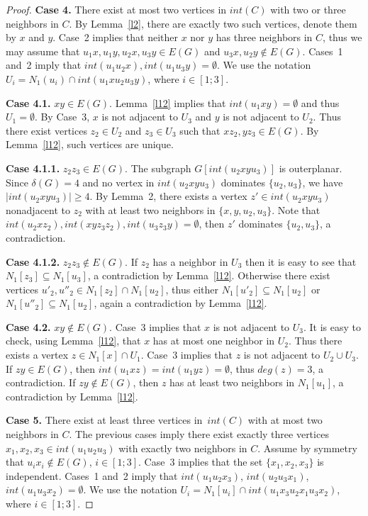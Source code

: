 \documentclass[12pt]{article}
\begin{document}
\begin{proof}
\textbf{Case 4.} There exist at most two vertices in $int(C)$ with two or three neighbors in $C$. By Lemma~\ref{l2}, there are exactly two such vertices, denote them by $x$ and $y$. Case~2 implies that neither $x$ nor $y$ has three neighbors in $C$, thus we may assume that $u_1x,u_1y,u_2x,u_3y \in E(G)$ and $u_3x,u_2y \notin E(G)$. Cases~1 and~2 imply that $int(u_1u_2x), int(u_1u_3y) = \emptyset$. We use the notation $U_i = N_1(u_i) \cap int(u_1xu_2u_3y)$, where $i \in [1;3]$. 

\textbf{Case 4.1.} $xy \in E(G)$. Lemma~\ref{l12} implies that $int(u_1xy) = \emptyset$ and thus $U_1 = \emptyset$. By Case~3, $x$ is not adjacent to $U_3$ and $y$ is not adjacent to $U_2$. Thus there exist vertices $z_2 \in U_2$ and $z_3 \in U_3$ such that $xz_2, yz_3 \in E(G)$. By Lemma~\ref{l12}, such vertices are unique.

\textbf{Case 4.1.1.} $z_2z_3 \in E(G)$. The subgraph $G[int(u_2xyu_3)]$ is outerplanar. Since $\delta(G) = 4$ and no vertex in $int(u_2xyu_3)$ dominates $\{u_2,u_3\}$, we have $|int(u_2xyu_3)| \geq 4$.  By Lemma~2, there exists a vertex $z' \in int(u_2xyu_3)$ nonadjacent to $z_2$ with at least two neighbors in $\{x,y,u_2,u_3\}$. Note that $int(u_2xz_2), int(xyz_3z_2), int(u_3z_3y) = \emptyset$, then $z'$ dominates $\{u_2,u_3\}$, a contradiction. 

\textbf{Case 4.1.2.} $z_2z_3 \notin E(G)$. If $z_2$ has a neighbor in $U_3$ then it is easy to see that $N_1[z_3] \subseteq N_1[u_3]$, a contradiction by Lemma~\ref{l12}. Otherwise there exist vertices $u'_2,u''_2 \in N_1[z_2] \cap N_1[u_2]$, thus either $N_1[u'_2] \subseteq N_1[u_2]$ or $N_1[u''_2] \subseteq N_1[u_2]$, again a contradiction by Lemma~\ref{l12}.

\textbf{Case 4.2.} $xy \notin E(G)$. Case~3 implies that $x$ is not adjacent to $U_3$. It is easy to check, using Lemma~\ref{l12}, that $x$ has at most one neighbor in $U_2$. Thus there exists a vertex $z \in N_1[x] \cap U_1$. Case~3 implies that $z$ is not adjacent to $U_2 \cup U_3$. If $zy \in E(G)$, then $int(u_1xz) = int(u_1yz) = \emptyset$, thus $deg(z) = 3$, a contradiction.  If $zy \notin E(G)$, then $z$ has at least two neighbors in $N_1[u_1]$, a contradiction by Lemma~\ref{l12}.
 
\textbf{Case 5.} There exist at least three vertices in~$int(C)$ with at most two neighbors in $C$. The previous cases imply there exist exactly three vertices $x_1,x_2,x_3 \in int(u_1u_2u_3)$ with exactly two neighbors in $C$. Assume by symmetry that $u_ix_i \notin E(G)$, $i \in [1;3]$. Case~3 implies that the set $\{x_1,x_2,x_3\}$ is independent. Cases~1 and~2 imply that $int(u_1u_2x_3)$, $int(u_2u_3x_1)$, $int(u_1u_3x_2) = \emptyset$. We use the notation $U_i = N_1[u_i] \cap int(u_1x_3u_2x_1u_3x_2)$, where $i \in [1;3]$.


\end{proof}
\end{document}
